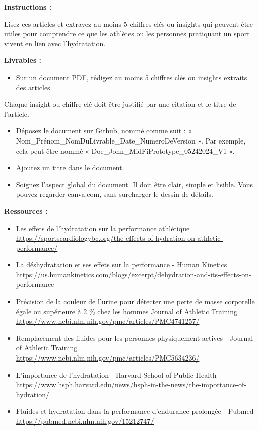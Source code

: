 \makeheaderfiles

\textbf{Instructions :}

Lisez ces articles et extrayez au moins 5 chiffres clés ou insights qui peuvent être utiles pour comprendre ce que les athlètes ou les personnes pratiquant un sport vivent en lien avec l'hydratation.

\textbf{Livrables :}

\begin{itemize}
\item Sur un document PDF, rédigez au moins 5 chiffres clés ou insights extraits des articles.
\end{itemize}
Chaque insight ou chiffre clé doit être justifié par une citation et le titre de l'article.
\begin{itemize}
\item Déposez le document sur Github, nommé comme suit : « Nom\_Prénom\_NomDuLivrable\_Date\_NumeroDeVersion ». Par exemple, cela peut être nommé « Doe\_John\_MidFiPrototype\_05242024\_V1 ».
\item Ajoutez un titre dans le document.
\item Soignez l'aspect global du document. Il doit être clair, simple et lisible. Vous pouvez regarder canva.com, sans surcharger le dessin de détails.
\end{itemize}

\textbf{Ressources :}

\begin{itemize}
\item Les effets de l'hydratation sur la performance athlétique \url{https://sportscardiologybc.org/the-effects-of-hydration-on-athletic-performance/}
\item La déshydratation et ses effets sur la performance - Human Kinetics \url{https://us.humankinetics.com/blogs/excerpt/dehydration-and-its-effects-on-performance}
\item Précision de la couleur de l'urine pour détecter une perte de masse corporelle égale ou supérieure à 2 \% chez les hommes Journal of Athletic Training \url{https://www.ncbi.nlm.nih.gov/pmc/articles/PMC4741257/}
\item Remplacement des fluides pour les personnes physiquement actives - Journal of Athletic Training \url{https://www.ncbi.nlm.nih.gov/pmc/articles/PMC5634236/}
\item L'importance de l'hydratation - Harvard School of Public Health \url{https://www.hsph.harvard.edu/news/hsph-in-the-news/the-importance-of-hydration/}
\item Fluides et hydratation dans la performance d'endurance prolongée - Pubmed \url{https://pubmed.ncbi.nlm.nih.gov/15212747/}
\end{itemize}

